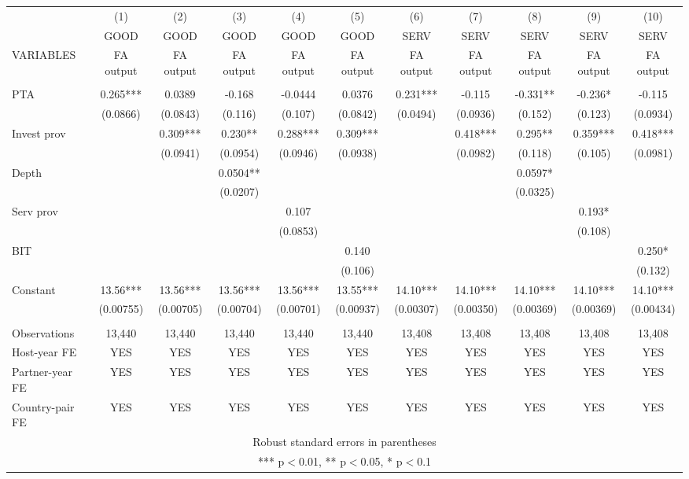 \begin{tabular}{lcccccccccc} \hline
 & (1) & (2) & (3) & (4) & (5) & (6) & (7) & (8) & (9) & (10) \\
 & GOOD & GOOD & GOOD & GOOD & GOOD & SERV & SERV & SERV & SERV & SERV \\
VARIABLES & FA output & FA output & FA output & FA output & FA output & FA output & FA output & FA output & FA output & FA output \\ \hline
 &  &  &  &  &  &  &  &  &  &  \\
PTA & 0.265*** & 0.0389 & -0.168 & -0.0444 & 0.0376 & 0.231*** & -0.115 & -0.331** & -0.236* & -0.115 \\
 & (0.0866) & (0.0843) & (0.116) & (0.107) & (0.0842) & (0.0494) & (0.0936) & (0.152) & (0.123) & (0.0934) \\
Invest prov &  & 0.309*** & 0.230** & 0.288*** & 0.309*** &  & 0.418*** & 0.295** & 0.359*** & 0.418*** \\
 &  & (0.0941) & (0.0954) & (0.0946) & (0.0938) &  & (0.0982) & (0.118) & (0.105) & (0.0981) \\
Depth &  &  & 0.0504** &  &  &  &  & 0.0597* &  &  \\
 &  &  & (0.0207) &  &  &  &  & (0.0325) &  &  \\
Serv prov &  &  &  & 0.107 &  &  &  &  & 0.193* &  \\
 &  &  &  & (0.0853) &  &  &  &  & (0.108) &  \\
BIT &  &  &  &  & 0.140 &  &  &  &  & 0.250* \\
 &  &  &  &  & (0.106) &  &  &  &  & (0.132) \\
Constant & 13.56*** & 13.56*** & 13.56*** & 13.56*** & 13.55*** & 14.10*** & 14.10*** & 14.10*** & 14.10*** & 14.10*** \\
 & (0.00755) & (0.00705) & (0.00704) & (0.00701) & (0.00937) & (0.00307) & (0.00350) & (0.00369) & (0.00369) & (0.00434) \\
 &  &  &  &  &  &  &  &  &  &  \\
Observations & 13,440 & 13,440 & 13,440 & 13,440 & 13,440 & 13,408 & 13,408 & 13,408 & 13,408 & 13,408 \\
Host-year FE & YES & YES & YES & YES & YES & YES & YES & YES & YES & YES \\
Partner-year FE & YES & YES & YES & YES & YES & YES & YES & YES & YES & YES \\
 Country-pair FE & YES & YES & YES & YES & YES & YES & YES & YES & YES & YES \\ \hline
\multicolumn{11}{c}{ Robust standard errors in parentheses} \\
\multicolumn{11}{c}{ *** p$<$0.01, ** p$<$0.05, * p$<$0.1} \\
\end{tabular}
